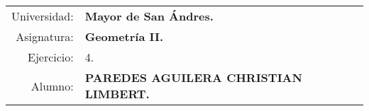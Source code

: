 \begin{tabular}{r l }
Universidad: & \textbf{Mayor de San Ándres.}\\
Asignatura: & \textbf{Geometría II.}\\
Ejercicio: & 4.\\ 
Alumno: & \textbf{PAREDES AGUILERA CHRISTIAN LIMBERT.}
\end{tabular}
\begin{flushleft}
\end{flushleft}
\vspace{.2cm}
